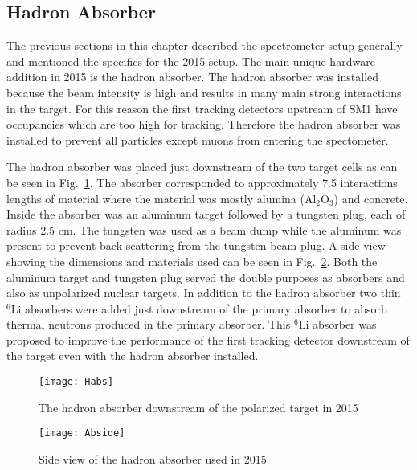 \subsection{Hadron Absorber}
The previous sections in this chapter described the spectrometer setup generally
and mentioned the specifics for the 2015 setup.  The main unique hardware
addition in 2015 is the hadron absorber.  The hadron absorber was installed
because the beam intensity is high and results in many main strong interactions
in the target.  For this reason the first tracking detectors upstream of SM1
have occupancies which are too high for tracking.  Therefore the hadron absorber
was installed to prevent all particles except muons from entering the
spectometer. \par

The hadron absorber was placed just downstream of the two target cells as can be
seen in Fig.~\ref{fig::Habs}.  The absorber corresponded to approximately 7.5
interactions lengths of material where the material was mostly alumina
(Al$_2$O$_3$) and concrete.  Inside the absorber was an aluminum target followed
by a tungsten plug, each of radius 2.5 cm.  The tungsten was used as a beam dump
while the aluminum was present to prevent back scattering from the tungsten beam
plug.  A side view showing the dimensions and materials used can be seen in
Fig.~\ref{fig::Abside}.  Both the aluminum target and tungsten plug served the
double purposes as absorbers and also as unpolarized nuclear targets.  In
addition to the hadron absorber two thin $^6\mathrm{Li}$ absorbers were added
just downstream of the primary absorber to absorb thermal neutrons produced in
the primary absorber.  This $^6\mathrm{Li}$ absorber was proposed to improve the
performance of the first tracking detector downstream of the target even with
the hadron absorber installed. \par

\begin{figure}[h!t]
  \centering
  \texttt{[image: Habs]}
  \caption{The hadron absorber downstream of the polarized target in 2015}
  \label{fig::Habs}
\end{figure}

\begin{figure}[h!t]
  \centering
  \texttt{[image: Abside]}
  \caption{Side view of the hadron absorber used in 2015}
  \label{fig::Abside}
\end{figure}
